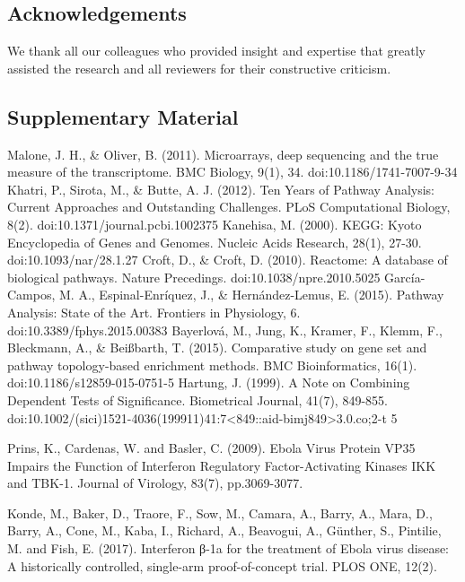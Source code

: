 \documentclass[twocolumn]{article}
\begin{document}
\subsection*{Acknowledgements}

We thank all our colleagues who provided insight and expertise that greatly assisted the research and all reviewers for their constructive criticism.  

\subsection*{Supplementary Material}


\newpage 


\begin{thebibliography}{9}
	 
	Malone, J. H., \& Oliver, B. (2011). Microarrays, deep sequencing and the true measure of the transcriptome. BMC Biology, 9(1), 34. doi:10.1186/1741-7007-9-34
	Khatri, P., Sirota, M., \& Butte, A. J. (2012). Ten Years of Pathway Analysis: Current Approaches and Outstanding Challenges. PLoS Computational Biology, 8(2). doi:10.1371/journal.pcbi.1002375
	Kanehisa, M. (2000). KEGG: Kyoto Encyclopedia of Genes and Genomes. Nucleic Acids Research, 28(1), 27-30. doi:10.1093/nar/28.1.27
	Croft, D., \& Croft, D. (2010). Reactome: A database of biological pathways. Nature Precedings. doi:10.1038/npre.2010.5025
	García-Campos, M. A., Espinal-Enríquez, J., \& Hernández-Lemus, E. (2015). Pathway Analysis: State of the Art. Frontiers in Physiology, 6. doi:10.3389/fphys.2015.00383 
	Bayerlová, M., Jung, K., Kramer, F., Klemm, F., Bleckmann, A., \& Beißbarth, T. (2015). Comparative study on gene set and pathway topology-based enrichment methods. BMC Bioinformatics, 16(1). doi:10.1186/s12859-015-0751-5   
	Hartung, J. (1999). A Note on Combining Dependent Tests of Significance. Biometrical Journal, 41(7), 849-855. doi:10.1002/(sici)1521-4036(199911)41:7<849::aid-bimj849>3.0.co;2-t 5 
	
	Prins, K., Cardenas, W. and Basler, C. (2009). Ebola Virus Protein VP35 Impairs the Function of Interferon Regulatory Factor-Activating Kinases IKK and TBK-1. Journal of Virology, 83(7), pp.3069-3077.
	
	Konde, M., Baker, D., Traore, F., Sow, M., Camara, A., Barry, A., Mara, D., Barry, A., Cone, M., Kaba, I., Richard, A., Beavogui, A., Günther, S., Pintilie, M. and Fish, E. (2017). Interferon β-1a for the treatment of Ebola virus disease: A historically controlled, single-arm proof-of-concept trial. PLOS ONE, 12(2).
	

\end{thebibliography}
\end{document}
